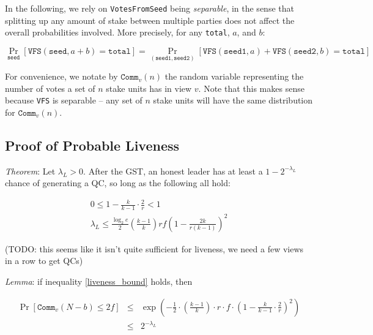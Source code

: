 \documentclass[11pt, oneside]{article}       %
\begin{document}
In the following, we rely on \texttt{VotesFromSeed} being \emph{separable}, in
the sense that splitting up any amount of stake between multiple parties
does not affect the overall probabilities involved. More precisely, for any
\texttt{total}, \(a\), and \(b\):

\[
    \Pr_{\texttt{seed}}[\texttt{VFS}(\texttt{seed},a+b) =
    \texttt{total}] = \Pr_{(\texttt{seed1},\texttt{seed2})}[
        \texttt{VFS}(\texttt{seed1},a) + \texttt{VFS}(\texttt{seed2},b) =
    \texttt{total}]
\]

For convenience, we notate by \(\texttt{Comm}_v(n)\) the random variable representing
the number of votes a set of \(n\) stake units has in view \(v\). Note that this makes
sense because \texttt{VFS} is separable -- any set of \(n\) stake units
will have the same distribution for \(\texttt{Comm}_v(n)\).

\subsection*{Proof of Probable Liveness}

\emph{Theorem}: Let \(\lambda_L > 0\). After the GST, an honest leader has at least a \(1 -
2^{-\lambda_L}\) chance of generating a QC, so long as the following all
hold:

\begin{equation}\label{liveness_bound}
    \begin{array}{c}
        0 \leq 1 - \frac{k}{k-1}\cdot\frac{2}{r} < 1 \\

        \lambda_L \leq \frac{\log_2 e}{2} \left(\frac{k-1}{k}\right) r f \left(1 -
        \frac{2k}{r(k-1)}\right)^2
    \end{array}
\end{equation}

(TODO: this seems like it isn't quite sufficient for liveness, we need a
few views in a row to get QCs)

\emph{Lemma}: if inequality \eqref{liveness_bound} holds, then

\[
\begin{array}{rcl}
    \Pr[\texttt{Comm}_v(N-b) \leq 2f] & \leq & \exp\left(
        -\frac{1}{2} \cdot
         \left(\frac{k-1}{k}\right)
         \cdot r\cdot f \cdot
         \left(1-\frac{k}{k-1}\cdot \frac{2}{r}\right)^2
    \right)
    \\
    &\leq&2^{-\lambda_L}
\end{array}
\]
\end{document}
